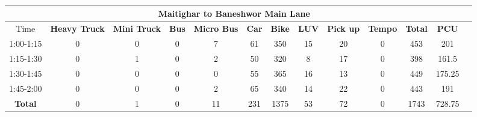 \begin{landscape}
\begin{table}[h!]
\vspace{0.5cm}
\begin{tabular}{|c|c|c|c|c|c|c|c|c|c|c|c|c|}
    \hline
    \multicolumn{12}{|c|}{\textbf{Maitighar to Baneshwor Main Lane}} \\
    \hline
        Time & \textbf{Heavy Truck} & \textbf{Mini Truck} & \textbf{Bus} & \textbf{Micro Bus} & \textbf{Car} & \textbf{Bike} & \textbf{LUV} & \textbf{Pick up} & \textbf{Tempo} & \textbf{\textbf{Total}} & \textbf{PCU} \\
    \hline
1:00-1:15	&0	&0	&0	&7	&61	&350	&15	&20	&0	&453	&201 \\ \hline
1:15-1:30	&0	&1	&0	&2	&50	&320	&8	&17	&0	&398	&161.5 \\ \hline
1:30-1:45	&0	&0	&0	&0	&55	&365	&16	&13	&0	&449	&175.25 \\ \hline
1:45-2:00	&0	&0	&0	&2	&65	&340	&14	&22	&0	&443	&191 \\ \hline
\textbf{Total}	&0	&1	&0	&11	&231	&1375	&53	&72	&0	&1743	&728.75 \\ \hline
\end{tabular}

\end{table}
\end{landscape}


